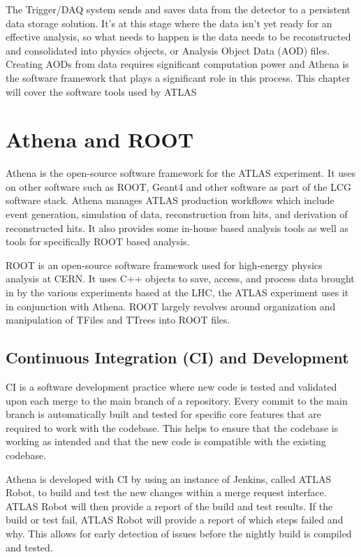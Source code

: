 The Trigger/DAQ system sends and saves data from the detector to a persistent data storage solution.
It's at this stage where the data isn't yet ready for an effective analysis, so what needs to happen is the data needs to be reconstructed and consolidated into physics objects, or Analysis Object Data (AOD) files.
Creating AODs from data requires significant computation power and Athena is the software framework that plays a significant role in this process.
This chapter will cover the software tools used by ATLAS 

\section{Athena and ROOT}
Athena is the open-source software framework for the ATLAS experiment.\cite{athena}
It uses on other software such as ROOT, Geant4 and other software as part of the LCG software stack. 
Athena manages ATLAS production workflows which include event generation, simulation of data, reconstruction from hits, and derivation of reconstructed hits.\cite{athenadocs}
It also provides some in-house based analysis tools as well as tools for specifically ROOT based analysis.

ROOT is an open-source software framework used for high-energy physics analysis at CERN.\cite{ROOT_about} 
It uses C++ objects to save, access, and process data brought in by the various experiments based at the LHC, the ATLAS experiment uses it in conjunction with Athena.
ROOT largely revolves around organization and manipulation of TFiles and TTrees into ROOT files.

\subsection{Continuous Integration (CI) and Development}
CI is a software development practice where new code is tested and validated upon each merge to the main branch of a repository. 
Every commit to the main branch is automatically built and tested for specific core features that are required to work with the codebase. 
This helps to ensure that the codebase is working as intended and that the new code is compatible with the existing codebase.

Athena is developed with CI by using an instance of Jenkins, called ATLAS Robot, to build and test the new changes within a merge request interface. 
ATLAS Robot will then provide a report of the build and test results.
If the build or test fail, ATLAS Robot will provide a report of which steps failed and why.
This allows for early detection of issues before the nightly build is compiled and tested.



